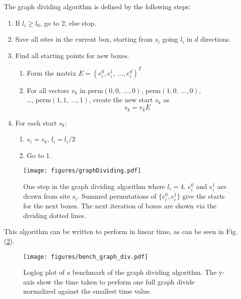 The graph dividing algorithm is defined by the following steps:

\begin{enumerate}
    \item If $l_i \geq l_0$, go to 2, else stop.
%
    \item Save all sites in the current box, starting from $s_i$ going $l_i$ in $d$ directions.
%
    \item Find all starting points for new boxes.
%
    \begin{enumerate}[label=(\roman*)]
%
        \item Form the matrix $E = (e_i^0, e_i^1, \  \ldots, e_i^d)^T$
%
        \item For all vectors $v_k$ in perm$(0, 0, \ \ldots , 0)$, perm$(1, 0, \ \ldots , 0)$, \\ \ldots, perm$(1, 1, \ \ldots , 1)$, create the new start $s_k$ as $$s_k = v_k E$$
%
    \end{enumerate}
%
    \item For each start $s_k$:
    \begin{enumerate}[label=(\roman*)]
        \item $s_i = s_k$, $l_i = l_i / 2$
        \item Go to 1.
    \end{enumerate}
%
\end{enumerate}


\begin{figure}[h!]
    \centering
        \texttt{[image: figures/graphDividing.pdf]}
    \caption{One step in the graph dividing algorithm where $l_i = 4$. $e^0_i$ and $e^1_i$ are drawn from site $s_i$. Summed permutations of $\{e^0_i, e^1_i\}$ give the starts for the next boxes. The next iteration of boxes are shown via the dividing dotted lines.}
    \label{fig:graphdividingalgo}
\end{figure}

This algorithm can be written to perform in linear time, as can be seen in Fig. (\ref{fig:bench_graphdiv}). 

\begin{figure}[h!]
    \centering
        \texttt{[image: figures/bench\_graph\_div.pdf]}
    \caption{Loglog plot of a benchmark of the graph dividing algorithm. The y-axis show the time taken to perform one full graph divide normalized against the smallest time value.}
    \label{fig:bench_graphdiv}
\end{figure}

